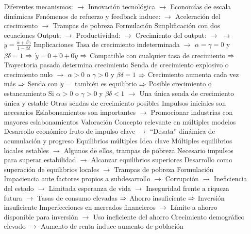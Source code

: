 \documentclass{nuevotema}
\begin{document}
\begin{esquemal}
				\4 Diferentes mecanismos:
				\4[] $\to$ Innovación tecnológica
				\4[] $\to$ Economías de escala dinámicas
				\4 Fenómenos de refuerzo y feedback induce:
				\4[] $\to$ Aceleración del crecimiento
				\4[] $\to$ Trampas de pobreza
			\3 Formulación
				\4 Simplificación con dos ecuaciones
				\4 Output:
				\4[] $\to$ 
				\4 Productividad:
				\4[] $\to$ 
				\4 Crecimiento del output:
				\4[] $\to$ 
				\4[] $\to$ $\dot{y} = \frac{\alpha + \beta \gamma}{1-\beta \delta}$
			\3 Implicaciones
				\4 Tasa de crecimiento indeterminada
				\4[] $\to$ $\alpha=\gamma=0$ y $\beta \delta = 1$
				\4[] $\Rightarrow$ $\dot{y} = 0 + 0 + 0 \dot{y}$
				\4[] $\Rightarrow$ Compatible con cualquier tasa de crecimiento
				\4[] $\Rightarrow$ Trayectoria pasada determina crecimiento
				\4 Senda de crecimiento explosivo o crecimiento nulo
				\4[] $\to$ $\alpha>0$ o $\gamma>0$ y $\beta\delta = 1$
				\4[] $\Rightarrow$ Crecimiento aumenta cada vez más
				\4[] $\Rightarrow$ Senda con $\dot{y}=$ también es equilibrio
				\4[] $\Rightarrow$ Posible crecimiento o estancamiento
				\4 Si $\alpha>0$ o $\gamma >0$ y $\beta \delta < 1$
				\4[] $\to$ Una única senda de crecimiento única y estable
				\4 Otras sendas de crecimiento posibles
				\4[] Impulsos iniciales son necesarios
				\4 Eslabonamientos son importantes
				\4[] $\to$ Promocionar industrias con mayores eslabonamientos
			\3 Valoración
				\4 Concepto relevante en múltiples modelos
				\4 Desarrollo económico fruto de impulso clave
				\4[] $\to$ ``Desata'' dinámica de acumulación y progreso
		\2 Equilibrios múltiples
			\3 Idea clave
				\4 Múltiples equilibrios locales estables
				\4[] $\to$ Algunos de ellos, trampas de pobreza
				\4 Necesario impulsos para superar estabilidad
				\4[] $\to$ Alcanzar equilibrios superiores
				\4 Desarrollo como superación de equilibrios locales
				\4[] $\to$ Trampas de pobreza
			\3 Formulación
				\4 Impaciencia ante factores propios a subdesarrollo
				\4[] $\to$ Corrupción
				\4[] $\to$ Ineficiencia del estado
				\4[] $\to$ Limitada esperanza de vida
				\4[] $\to$ Inseguridad frente a riqueza futura
				\4[] $\to$ Tasas de consumo elevadas
				\4[] $\Rightarrow$ Ahorro insuficiente
				\4[] $\Rightarrow$ Inversión insuficiente
				\4 Imperfecciones en mercados financieros
				\4[] $\to$ Límite a ahorro disponible para inversión
				\4[] $\to$ Uso ineficiente del ahorro
				\4 Crecimiento demográfico elevado
				\4[] $\to$ Aumento de renta induce aumento de población

\end{esquemal}
\end{document}
